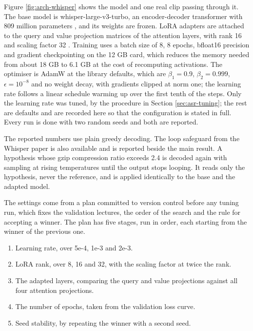 Figure \ref{fig:arch-whisper} shows the model and one real clip passing through it.
The base model is whisper-large-v3-turbo, an encoder-decoder transformer with 809 million
parameters \cite{radford2023whisper}, and its weights are frozen. LoRA adapters are
attached to the query and value projection matrices of the attention layers, with rank 16
and scaling factor 32 \cite{hu2022lora}. Training uses a batch size of 8, 8 epochs,
bfloat16 precision and gradient checkpointing on the 12 GB card, which reduces the memory
needed from about 18 GB to 6.1 GB at the cost of recomputing activations. The optimiser is
AdamW \cite{loshchilov2019adamw} at the library defaults, which are $\beta_1 = 0.9$,
$\beta_2 = 0.999$, $\epsilon = 10^{-8}$ and no weight decay, with gradients clipped at
norm one; the learning rate follows a linear schedule warming up over the first tenth of
the steps. Only the learning rate was tuned, by the procedure in Section
\ref{sec:asr-tuning}; the rest are defaults and are recorded here so that the
configuration is stated in full. Every run is done with two random seeds and both are reported.

The reported numbers use plain greedy decoding. The loop safeguard from the Whisper paper
is also available and is reported beside the main result. A hypothesis whose gzip
compression ratio exceeds 2.4 is decoded again with sampling at rising temperatures until
the output stops looping. It reads only the hypothesis, never the reference, and is
applied identically to the base and the adapted model.

The settings come from a plan committed to version control before any tuning run, which
fixes the validation lectures, the order of the search and the rule for accepting a
winner. The plan has five stages, run in order, each starting from the winner of the
previous one.

\begin{enumerate}
  \item Learning rate, over 5e-4, 1e-3 and 2e-3.
  \item LoRA rank, over 8, 16 and 32, with the scaling factor at twice the rank.
  \item The adapted layers, comparing the query and value projections against all four
        attention projections.
  \item The number of epochs, taken from the validation loss curve.
  \item Seed stability, by repeating the winner with a second seed.
\end{enumerate}

